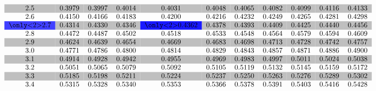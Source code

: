 \documentclass[handout]{beamer}
\begin{document}
{{\begin{equation*}
\begin{tabular}{*{11}{c}}
\rowcolor[gray]{0.75}
2.5 & 0.3979 & 0.3997 & 0.4014 & 0.4031 & 0.4048 & 0.4065 & 0.4082 & 0.4099 & 0.4116 & 0.4133 \\
2.6 & 0.4150 & 0.4166 & 0.4183 & 0.4200 & 0.4216 & 0.4232 & 0.4249 & 0.4265 & 0.4281 & 0.4298 \\
\rowcolor[gray]{0.75}\only<2>{\cellcolor{blue!75}}%
2.7 & 0.4314 & 0.4330 & 0.4346 & \only<2>{\cellcolor{blue!90}}0.4362 & 0.4378 & 0.4393 & 0.4409 & 0.4425 & 0.4440 & 0.4456 \\
2.8 & 0.4472 & 0.4487 & 0.4502 & 0.4518 & 0.4533 & 0.4548 & 0.4564 & 0.4579 & 0.4594 & 0.4609 \\
\rowcolor[gray]{0.75}
2.9 & 0.4624 & 0.4639 & 0.4654 & 0.4669 & 0.4683 & 0.4698 & 0.4713 & 0.4728 & 0.4742 & 0.4757 \\
3.0 & 0.4771 & 0.4786 & 0.4800 & 0.4814 & 0.4829 & 0.4843 & 0.4857 & 0.4871 & 0.4886 & 0.4900 \\
\rowcolor[gray]{0.75}
3.1 & 0.4914 & 0.4928 & 0.4942 & 0.4955 & 0.4969 & 0.4983 & 0.4997 & 0.5011 & 0.5024 & 0.5038 \\
3.2 & 0.5051 & 0.5065 & 0.5079 & 0.5092 & 0.5105 & 0.5119 & 0.5132 & 0.5145 & 0.5159 & 0.5172 \\
\rowcolor[gray]{0.75}
3.3 & 0.5185 & 0.5198 & 0.5211 & 0.5224 & 0.5237 & 0.5250 & 0.5263 & 0.5276 & 0.5289 & 0.5302 \\
3.4 & 0.5315 & 0.5328 & 0.5340 & 0.5353 & 0.5366 & 0.5378 & 0.5391 & 0.5403 & 0.5416 & 0.5428 \\
\end{tabular}
\end{equation*}
}

\smallskip

\bigskip
\bigskip

}
\end{document}

